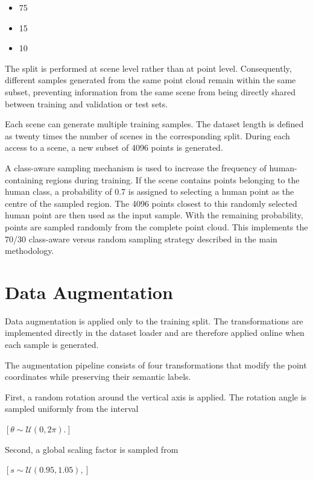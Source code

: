 \begin{itemize}
\item 75%
\item 15%
\item 10%
\end{itemize}

The split is performed at scene level rather than at point level. Consequently, different samples generated from the same point cloud remain within the same subset, preventing information from the same scene from being directly shared between training and validation or test sets.

Each scene can generate multiple training samples. The dataset length is defined as twenty times the number of scenes in the corresponding split. During each access to a scene, a new subset of 4096 points is generated.

A class-aware sampling mechanism is used to increase the frequency of human-containing regions during training. If the scene contains points belonging to the human class, a probability of 0.7 is assigned to selecting a human point as the centre of the sampled region. The 4096 points closest to this randomly selected human point are then used as the input sample. With the remaining probability, points are sampled randomly from the complete point cloud. This implements the 70/30 class-aware versus random sampling strategy described in the main methodology.

\section{Data Augmentation}
\label{app:data_augmentation}

Data augmentation is applied only to the training split. The transformations are implemented directly in the dataset loader and are therefore applied online when each sample is generated.

The augmentation pipeline consists of four transformations that modify the point coordinates while preserving their semantic labels.

First, a random rotation around the vertical axis is applied. The rotation angle is sampled uniformly from the interval

$[
\theta \sim \mathcal{U}(0,2\pi).
]$

Second, a global scaling factor is sampled from

$[
s \sim \mathcal{U}(0.95,1.05),
]$


